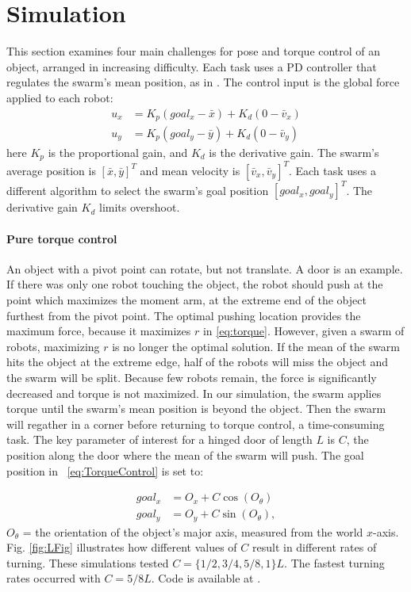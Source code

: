 
\section{Simulation}\label{sec:simulation}
This section examines four main challenges for pose and torque control of an object, arranged in increasing difficulty.  Each task uses a PD controller that regulates the swarm's mean position,  as in \cite{ShahrokhiIROS2015}. The control input is the global force applied to each robot:
\begin{align}
u_x &= K_{p}(goal_x - \bar{x}) + K_{d}(0-\bar{v}_x) \nonumber\\
u_y &= K_{p}(goal_y  - \bar{y}) + K_{d}(0-\bar{v}_y)  \label{eq:PDcontrolPosition}
\end{align}
here $K_{p}$ is the proportional gain, and $K_{d}$ is the derivative gain.  
The swarm's average position is $[\bar{x},\bar{y}]^T$ and mean velocity is $[\bar{v}_x,\bar{v}_y]^T$.  
Each task uses a different algorithm to select the swarm's goal position $[goal_x,goal_y]^T$. The derivative gain $K_d$ limits overshoot.

\paragraph{Pure torque control} \label{sec:simulationPureTorque}
An object with a pivot point can rotate, but not translate. A door is an example.
 If there was only one robot touching the object, the robot should push at the point which maximizes the moment arm, at the extreme end of the object furthest from the pivot point.
The optimal pushing location provides the maximum force, because it maximizes  $r$ in \eqref{eq:torque}.
However, given a swarm of robots, maximizing $r$ is no longer the optimal solution.  
If the mean of the swarm hits the object at the extreme edge, half of the robots will miss the object and  the swarm will be split.
Because few robots remain,  the force is significantly decreased and torque is not maximized.
 In our simulation, the swarm applies torque until the swarm's mean position is beyond the object. Then the swarm will regather in a corner before returning to torque control, a time-consuming task. 
 The key parameter of interest for a hinged door of length $L$ is $C$, the position along the door where the mean of the swarm will push.  The goal position in ~\eqref{eq:TorqueControl} is set to:
 
\begin{align}\nonumber
goal_x &= O_x + C \cos(O_{\theta}) \\
goal_y &= O_y + C \sin(O_{\theta}),  \label{eq:TorqueControl}
\end{align}
$O_{\theta}$ = the orientation of the object's major axis, measured from the world $x$-axis.
 Fig. \ref{fig:LFig} illustrates how different values of $C$ result in different rates of turning. These simulations tested $C = \{1/2, 3/4, 5/8, 1\}L$. The fastest turning rates occurred with  $C =  5/8L$. Code is available at \cite{Shahrokhi16torque}.



